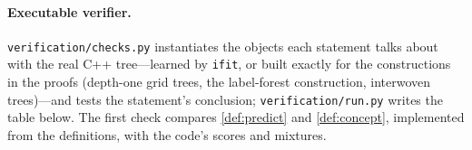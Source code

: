 \documentclass[11pt]{article}
\theoremstyle{definition}
\theoremstyle{remark}
\begin{document}
\paragraph{Executable verifier.}
\texttt{verification/checks.py} instantiates the objects each statement talks about with
the real C++ tree---learned by \texttt{ifit}, or built exactly for the constructions in
the proofs (depth-one grid trees, the label-forest construction, interwoven trees)---and
tests the statement's conclusion; \texttt{verification/run.py} writes the table below.
The first check compares \cref{def:predict} and \cref{def:concept}, implemented from the
definitions, with the code's scores and mixtures.

\end{document}

